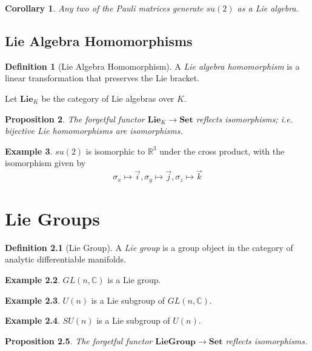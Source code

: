 \documentclass{book}
\newtheorem{prop}{Proposition}[chapter]
\newtheorem{cor}{Corollary}[prop]
\theoremstyle{definition}
\newtheorem{df}[prop]{Definition}
\newtheorem{ex}[prop]{Example}
\newcommand{\Set}{\ensuremath{\mathbf{Set}}}
\begin{document}
\begin{cor}
Any two of the Pauli matrices generate $su(2)$ as a Lie algebra.
\end{cor}

\section{Lie Algebra Homomorphisms}

\begin{df}[Lie Algebra Homomorphism]
A \emph{Lie algebra homomorphism} is a linear transformation that preserves the Lie bracket.

Let $\mathbf{Lie}_K$ be the category of Lie algebras over $K$.
\end{df}

\begin{prop}
The forgetful functor $\mathbf{Lie}_K \rightarrow \Set$ reflects isomorphisms; i.e. bijective Lie homomorphisms are isomorphisms.
\end{prop}


\begin{ex}
$su(2)$ is isomorphic to $\mathbb{R}^3$ under the cross product, with the isomorphism given by
\[ \sigma_x \mapsto \vec{i}, \sigma_y \mapsto \vec{j}, \sigma_z \mapsto \vec{k} \]
\end{ex}

\chapter{Lie Groups}

\begin{df}[Lie Group]
A \emph{Lie group} is a group object in the category of analytic differentiable manifolds.
\end{df}

\begin{ex}
$GL(n,\mathbb{C})$ is a Lie group.
\end{ex}

\begin{ex}
$U(n)$ is a Lie subgroup of $GL(n,\mathbb{C})$.
\end{ex}

\begin{ex}
$SU(n)$ is a Lie subgroup of $U(n)$.
\end{ex}

\begin{prop}
The forgetful functor $\mathbf{LieGroup} \rightarrow \Set$ reflects isomorphisms.
\end{prop}
\end{document}
